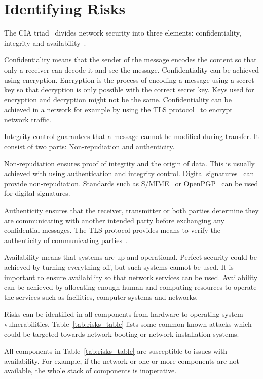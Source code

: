 \section{Identifying Risks}

The CIA triad~\cite{cia-triad} divides network security into three
elements: confidentiality, integrity and availability~\cite{anderson}.

Confidentiality means that the sender of the message encodes the
content so that only a receiver can decode it and see the
message. Confidentiality can be achieved using encryption. Encryption
is the process of encoding a message using a secret key so that
decryption is only possible with the correct secret key. Keys used for
encryption and decryption might not be the same. Confidentiality can
be achieved in a network for example by using the TLS
protocol~\cite{RFC5246} to encrypt network traffic.

Integrity control guarantees that a message cannot be modified during
transfer. It consist of two parts: Non-repudiation and authenticity.

Non-repudiation ensures proof of integrity and the origin of
data. This is usually achieved with using authentication and integrity
control. Digital signatures~\cite{Diffie2006}\cite{Goldwasser1988} can
provide non-repudiation. Standards such as S/MIME~\cite{RFC5751} or
OpenPGP~\cite{RFC4880} can be used for digital signatures.

Authenticity ensures that the receiver, transmitter or both parties
determine they are communicating with another intended party before
exchanging any confidential messages. The TLS protocol provides means
to verify the authenticity of communicating parties~\cite{RFC5246}.

Availability means that systems are up and operational. Perfect
security could be achieved by turning everything off, but such systems
cannot be used. It is important to ensure availability so that network
services can be used. Availability can be achieved by allocating
enough human and computing resources to operate the services such as
facilities, computer systems and networks.

Risks can be identified in all components from hardware to operating
system vulnerabilities. Table~\ref{tab:risks_table} lists some
common known attacks which could be targeted towards network booting
or network installation systems.

All components in Table~\ref{tab:risks_table} are susceptible to
issues with availability. For example, if the network or one or more
components are not available, the whole stack of components is
inoperative.

